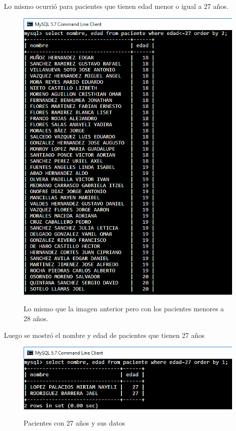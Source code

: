 \documentclass[12pt, titlepage]{article}
\begin{document}
	Lo mismo ocurrió para pacientes que tienen edad menor o igual a 27 años.
	\begin{figure}[H]
		\begin{center}
			\includegraphics[width=\textwidth]{img/siete.png}
			\label{fig:siete}
			\caption{Lo mismo que la imagen anterior pero con los pacientes menores a 28 años.}
		\end{center}
	\end{figure}
	Luego se mostró el nombre y edad de pacientes que tienen 27 años
	\begin{figure}[H]
		\begin{center}
			\includegraphics[width=\textwidth]{img/ocho.png}
			\label{fig:ocho}
			\caption{Pacientes con 27 años y sus datos}
		\end{center}
	\end{figure}
\end{document}
